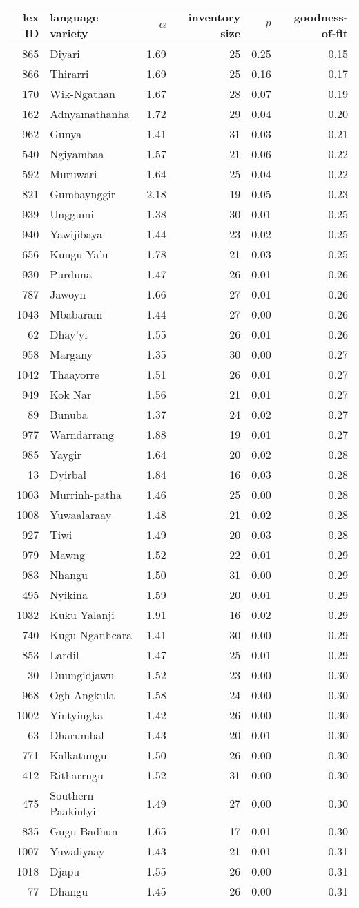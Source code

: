 \begin{longtable}[]{@{}rlrrrr@{}}
\toprule
\textbf{lex ID} & \textbf{language variety} & \(\alpha\) &
\textbf{inventory size} & \(p\) &
\textbf{goodness-of-fit}\tabularnewline
\midrule
\endhead
865 & Diyari & 1.69 & 25 & 0.25 & 0.15\tabularnewline
866 & Thirarri & 1.69 & 25 & 0.16 & 0.17\tabularnewline
170 & Wik-Ngathan & 1.67 & 28 & 0.07 & 0.19\tabularnewline
162 & Adnyamathanha & 1.72 & 29 & 0.04 & 0.20\tabularnewline
962 & Gunya & 1.41 & 31 & 0.03 & 0.21\tabularnewline
540 & Ngiyambaa & 1.57 & 21 & 0.06 & 0.22\tabularnewline
592 & Muruwari & 1.64 & 25 & 0.04 & 0.22\tabularnewline
821 & Gumbaynggir & 2.18 & 19 & 0.05 & 0.23\tabularnewline
939 & Unggumi & 1.38 & 30 & 0.01 & 0.25\tabularnewline
940 & Yawijibaya & 1.44 & 23 & 0.02 & 0.25\tabularnewline
656 & Kuugu Ya'u & 1.78 & 21 & 0.03 & 0.25\tabularnewline
930 & Purduna & 1.47 & 26 & 0.01 & 0.26\tabularnewline
787 & Jawoyn & 1.66 & 27 & 0.01 & 0.26\tabularnewline
1043 & Mbabaram & 1.44 & 27 & 0.00 & 0.26\tabularnewline
62 & Dhay'yi & 1.55 & 26 & 0.01 & 0.26\tabularnewline
958 & Margany & 1.35 & 30 & 0.00 & 0.27\tabularnewline
1042 & Thaayorre & 1.51 & 26 & 0.01 & 0.27\tabularnewline
949 & Kok Nar & 1.56 & 21 & 0.01 & 0.27\tabularnewline
89 & Bunuba & 1.37 & 24 & 0.02 & 0.27\tabularnewline
977 & Warndarrang & 1.88 & 19 & 0.01 & 0.27\tabularnewline
985 & Yaygir & 1.64 & 20 & 0.02 & 0.28\tabularnewline
13 & Dyirbal & 1.84 & 16 & 0.03 & 0.28\tabularnewline
1003 & Murrinh-patha & 1.46 & 25 & 0.00 & 0.28\tabularnewline
1008 & Yuwaalaraay & 1.48 & 21 & 0.02 & 0.28\tabularnewline
927 & Tiwi & 1.49 & 20 & 0.03 & 0.28\tabularnewline
979 & Mawng & 1.52 & 22 & 0.01 & 0.29\tabularnewline
983 & Nhangu & 1.50 & 31 & 0.00 & 0.29\tabularnewline
495 & Nyikina & 1.59 & 20 & 0.01 & 0.29\tabularnewline
1032 & Kuku Yalanji & 1.91 & 16 & 0.02 & 0.29\tabularnewline
740 & Kugu Nganhcara & 1.41 & 30 & 0.00 & 0.29\tabularnewline
853 & Lardil & 1.47 & 25 & 0.01 & 0.29\tabularnewline
30 & Duungidjawu & 1.52 & 23 & 0.00 & 0.30\tabularnewline
968 & Ogh Angkula & 1.58 & 24 & 0.00 & 0.30\tabularnewline
1002 & Yintyingka & 1.42 & 26 & 0.00 & 0.30\tabularnewline
63 & Dharumbal & 1.43 & 20 & 0.01 & 0.30\tabularnewline
771 & Kalkatungu & 1.50 & 26 & 0.00 & 0.30\tabularnewline
412 & Ritharrngu & 1.52 & 31 & 0.00 & 0.30\tabularnewline
475 & Southern Paakintyi & 1.49 & 27 & 0.00 & 0.30\tabularnewline
835 & Gugu Badhun & 1.65 & 17 & 0.01 & 0.30\tabularnewline
1007 & Yuwaliyaay & 1.43 & 21 & 0.01 & 0.31\tabularnewline
1018 & Djapu & 1.55 & 26 & 0.00 & 0.31\tabularnewline
77 & Dhangu & 1.45 & 26 & 0.00 & 0.31\tabularnewline

\end{longtable}
